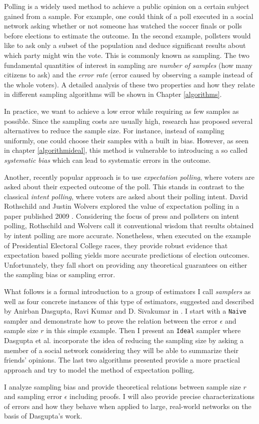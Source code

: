 Polling is a widely used method to achieve a public opinion on a certain subject gained from a sample. For example, one could think of a poll executed in a social network asking whether or not someone has watched the soccer finals or polls before elections to estimate the outcome.
In the second example, pollsters would like to ask only a subset of the population and deduce significant results about which party might win the vote. This is commonly known as sampling.
The two fundamental quantities of interest in sampling are \textit{number of samples} (how many citizens to ask) and the \textit{error rate} (error caused by observing a sample instead of the whole voters). A detailed analysis of these two properties and how they relate in different sampling algorithms will be shown in Chapter \ref{algorithms}.

In practice, we want to achieve a low error while requiring as few samples as possible.
Since the sampling costs are usually high, research has proposed several alternatives to reduce the sample size.
For instance, instead of sampling uniformly, one could choose their samples with a built in bias.
However, as seen in chapter \ref{algorithmideal}, this method is vulnerable to introducing a so called \textit{systematic bias} which can lead to systematic errors in the outcome.

Another, recently popular approach is to use \textit{expectation polling}, where voters are asked about their expected outcome of the poll. This stands in contrast to the classical \textit{intent polling}, where voters are asked about their polling intent. David Rothschild and Justin Wolvers explored the value of expectation polling in a paper published 2009 \cite{rothschild2009forecasting}. Considering the focus of press and pollsters on intent polling, Rothschild and Wolvers call it conventional wisdom that results obtained by intent polling are more accurate. Nonetheless, when executed on the example of Presidential Electoral College races, they provide robust evidence that expectation based polling yields more accurate predictions of election outcomes.
Unfortunately, they fall short on providing any theoretical guarantees on either the sampling bias or sampling error.

What follows is a formal introduction to a group of estimators I call \textit{samplers} as well as four concrete instances of this type of estimators, suggested and described by Anirban Dasgupta, Ravi Kumar and D. Sivakumar in \cite{dasgupta2012social}.
I start with a \texttt{Naive} sampler and demonstrate how to prove the relation between the error $\epsilon$ and sample size $r$ in this simple example. Then I present an \texttt{Ideal} sampler where Dasgupta et al. incorporate the idea of reducing the sampling size by asking a member of a social network considering they will be able to summarize their friends' opinions.
The last two algorithms presented provide a more practical approach and try to model the method of expectation polling.

I analyze sampling bias and provide theoretical relations between sample size $r$ and sampling error $\epsilon$ including proofs.
I will also provide precise characterizations of errors and how they behave when applied to large, real-world networks on the basis of Dasgupta's work.
